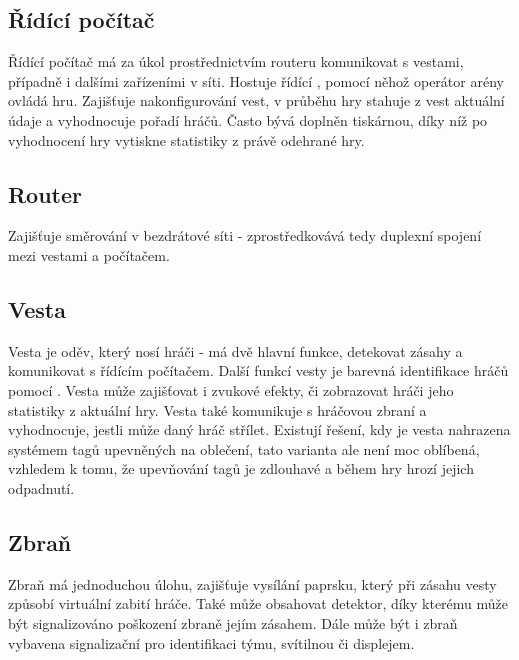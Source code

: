\subsection{Řídící počítač}
Řídící počítač má za úkol prostřednictvím routeru komunikovat s vestami, případně i dalšími zařízeními v síti. Hostuje řídící , pomocí něhož operátor arény ovládá hru. Zajišťuje nakonfigurování vest, v průběhu hry stahuje z vest aktuální údaje a vyhodnocuje pořadí hráčů. Často bývá doplněn tiskárnou, díky níž po vyhodnocení hry vytiskne statistiky z právě odehrané hry.

\subsection{Router}
Zajišťuje směrování v bezdrátové síti - zprostředkovává tedy duplexní spojení mezi vestami a počítačem.

\subsection{Vesta}
Vesta je oděv, který nosí hráči - má dvě hlavní funkce, detekovat zásahy a komunikovat s řídícím počítačem. Další funkcí vesty je barevná identifikace hráčů pomocí  . Vesta může zajišťovat i zvukové efekty, či zobrazovat hráči jeho statistiky z aktuální hry. Vesta také komunikuje s hráčovou zbraní a vyhodnocuje, jestli může daný hráč střílet. Existují řešení, kdy je vesta nahrazena systémem tagů upevněných na oblečení, tato varianta ale není moc oblíbená, vzhledem k tomu, že upevňování tagů je zdlouhavé a během hry hrozí jejich odpadnutí.

\subsection{Zbraň}
Zbraň má jednoduchou úlohu, zajišťuje vysílání  paprsku, který při zásahu vesty způsobí virtuální zabití hráče. Také může obsahovat  detektor, díky kterému může být signalizováno poškození zbraně jejím zásahem. Dále může být i zbraň vybavena signalizační   pro identifikaci týmu, svítilnou či displejem.
